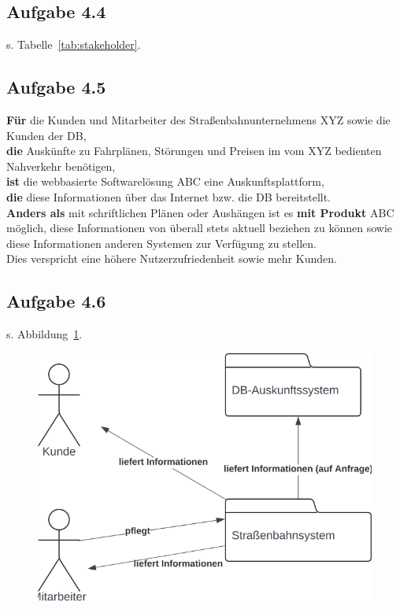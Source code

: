 \subsection{Aufgabe 4.4}
s. Tabelle~\ref{tab:stakeholder}.

\subsection{Aufgabe 4.5}
\textbf{Für} die Kunden und Mitarbeiter des Straßenbahnunternehmens XYZ sowie die Kunden der DB, \\
\textbf{die} Auskünfte zu Fahrplänen, Störungen und Preisen im vom XYZ bedienten Nahverkehr benötigen,\\
\textbf{ist} die webbasierte Softwarelösung ABC eine Auskunftsplattform,\\
\textbf{die} diese Informationen über das Internet bzw. die DB bereitstellt.\\
\textbf{Anders als} mit schriftlichen Plänen oder Aushängen ist es \textbf{mit Produkt} ABC möglich, diese Informationen von überall stets aktuell beziehen zu können sowie diese Informationen anderen Systemen zur Verfügung zu stellen.\\
Dies verspricht eine höhere Nutzerzufriedenheit sowie mehr Kunden.


\subsection{Aufgabe 4.6}

s. Abbildung~\ref{fig:aufgabe4-6}.

\begin{figure}
    \centering
    \includegraphics[scale=0.35]{chapters/Requirements Engineering/img/aufgabe4.6}
    \caption{}
    \label{fig:aufgabe4-6}
\end{figure}

